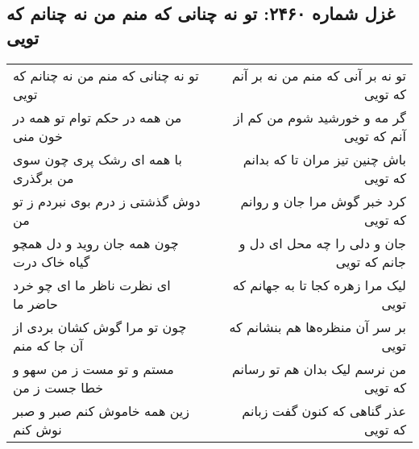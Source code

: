\begin{center}
\section*{غزل شماره ۲۴۶۰: تو نه چنانی که منم من نه چنانم که تویی}
\label{sec:2460}
\begin{longtable}{l p{0.5cm} r}
تو نه چنانی که منم من نه چنانم که تویی
&&
تو نه بر آنی که منم من نه بر آنم که تویی
\\
من همه در حکم توام تو همه در خون منی
&&
گر مه و خورشید شوم من کم از آنم که تویی
\\
با همه ای رشک پری چون سوی من برگذری
&&
باش چنین تیز مران تا که بدانم که تویی
\\
دوش گذشتی ز درم بوی نبردم ز تو من
&&
کرد خبر گوش مرا جان و روانم که تویی
\\
چون همه جان روید و دل همچو گیاه خاک درت
&&
جان و دلی را چه محل ای دل و جانم که تویی
\\
ای نظرت ناظر ما ای چو خرد حاضر ما
&&
لیک مرا زهره کجا تا به جهانم که تویی
\\
چون تو مرا گوش کشان بردی از آن جا که منم
&&
بر سر آن منظره‌ها هم بنشانم که تویی
\\
مستم و تو مست ز من سهو و خطا جست ز من
&&
من نرسم لیک بدان هم تو رسانم که تویی
\\
زین همه خاموش کنم صبر و صبر نوش کنم
&&
عذر گناهی که کنون گفت زبانم که تویی
\\
\end{longtable}
\end{center}
